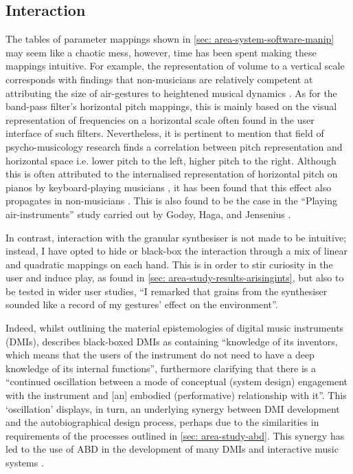 \subsection{Interaction}                        \label{sec: area-discussion-interaction}
The tables of parameter mappings shown in \autoref{sec: area-system-software-manip} may seem like a chaotic mess, however, time has been spent making these mappings intuitive. For example, the representation of volume to a vertical scale corresponds with findings that non-musicians are relatively competent at attributing the size of air-gestures to heightened musical dynamics \citep{godoy2006,caramiaux2010}. As for the band-pass filter’s horizontal pitch mappings, this is mainly based on the visual representation of frequencies on a horizontal scale often found in the user interface of such filters. Nevertheless, it is pertinent to mention that field of psycho-musicology research \citep{timmers2016} finds a correlation between pitch representation and horizontal space i.e. lower pitch to the left, higher pitch to the right. Although this is often attributed to the internalised representation of horizontal pitch on pianos by keyboard-playing musicians \citep{lidji2007,rusconi2006}, it has been found that this effect also propagates in non-musicians \citep{weis2016}. This is also found to be the case in the “Playing air-instruments” study carried out by Godøy, Haga, and Jensenius \citeyearpar{godoy2006}.

In contrast, interaction with the granular synthesiser is not made to be intuitive; instead, I have opted to hide or black-box the interaction through a mix of linear and quadratic mappings on each hand. This is in order to stir curiosity in the user and induce play, as found in \autoref{sec: area-study-results-arisingints}, but also to be tested in wider user studies, “I remarked that grains from the synthesiser sounded like a record of my gestures’ effect on the environment”.

Indeed, whilst outlining the material epistemologies of digital music instruments (DMIs), \citep{magnusson2009} describes black-boxed DMIs as containing  “knowledge of its inventors, which means that the users of the instrument do not need to have a deep knowledge of its internal functions”, furthermore clarifying that there is a “continued oscillation between a mode of conceptual (system design) engagement with the instrument and [an] embodied (performative) relationship with it”. This ‘oscillation’ displays, in turn, an underlying synergy between DMI development and the autobiographical design process, perhaps due to the similarities in requirements of the processes outlined in \autoref{sec: area-study-abd}. This synergy has led to the use of ABD in the development of many DMIs and interactive music systems \citep{kiefer2020,martin2017,turchet2018,unander-scharin2014}.

